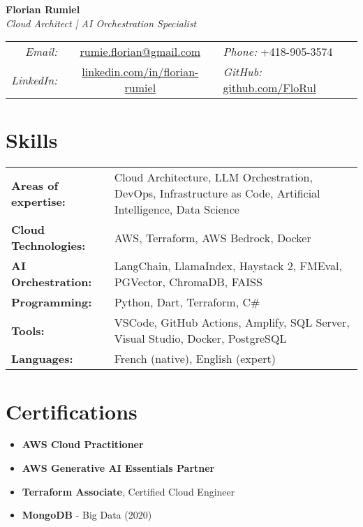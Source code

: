 ﻿\documentclass[11pt,letterpaper]{article}
\begin{document}
\begin{center}
  {\LARGE\textbf{Florian Rumiel}} \\[0.3em]
  {\large\textit{Cloud Architect | AI Orchestration Specialist}} \\[0.5em]
  \begin{tabular}{r c l}
    \textit{Email:} & \href{mailto:rumie.florian@gmail.com}{rumie.florian@gmail.com} & \textit{Phone:} +418-905-3574 \\
    \textit{LinkedIn:} & \href{https://linkedin.com/in/florian-rumiel}{linkedin.com/in/florian-rumiel} & \textit{GitHub:} \href{https://github.com/FloRul}{github.com/FloRul} \\
  \end{tabular}
\end{center}

\section*{Skills}
\begin{tabularx}{\textwidth}{@{}l X@{}}
\textbf{Areas of expertise:} & Cloud Architecture, LLM Orchestration, DevOps, Infrastructure as Code, Artificial Intelligence, Data Science \\[0.2em]
\textbf{Cloud Technologies:} & AWS, Terraform, AWS Bedrock, Docker \\[0.2em]
\textbf{AI Orchestration:} & LangChain, LlamaIndex, Haystack 2, FMEval, PGVector, ChromaDB, FAISS \\[0.2em]
\textbf{Programming:} & Python, Dart, Terraform, C\# \\[0.2em]
\textbf{Tools:} & VSCode, GitHub Actions, Amplify, SQL Server, Visual Studio, Docker, PostgreSQL \\[0.2em]
\textbf{Languages:} & French (native), English (expert) \\
\end{tabularx}

\section*{Certifications}
\begin{itemize}[leftmargin=1.5em]
  \item \textbf{AWS Cloud Practitioner}
  \item \textbf{AWS Generative AI Essentials Partner}
  \item \textbf{Terraform Associate}, Certified Cloud Engineer
  \item \textbf{MongoDB} - Big Data (2020)
\end{itemize}
\end{document}
